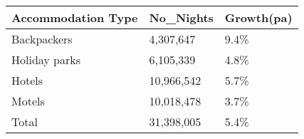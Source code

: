 \begin{tabular}[t]{|p{4.7cm}|p{1.25cm}|p{1.3cm}|}
  \hline
Accommodation Type & No\_Nights & Growth(pa) \\ 
  \hline
Backpackers &  4,307,647 & 9.4\% \\ 
  Holiday parks &  6,105,339 & 4.8\% \\ 
  Hotels & 10,966,542 & 5.7\% \\ 
  Motels & 10,018,478 & 3.7\% \\ 
  Total & 31,398,005 & 5.4\% \\ 
   \hline
\end{tabular}
